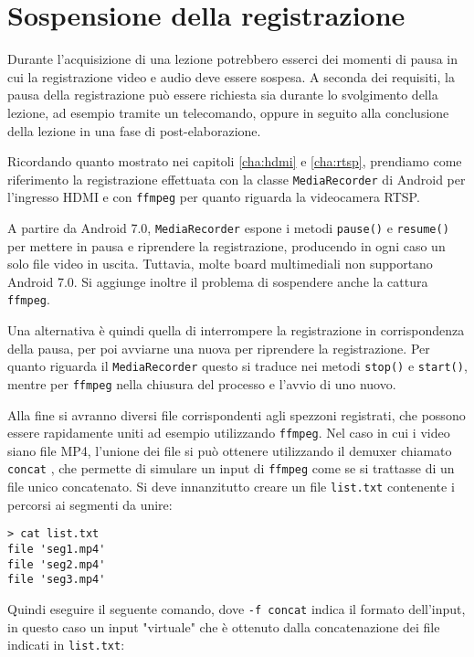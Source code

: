 \chapter{Sospensione della registrazione}
\label{cha:pausa}

Durante l'acquisizione di una lezione potrebbero esserci dei momenti di pausa in cui la registrazione video e audio deve essere sospesa. A seconda dei requisiti, la pausa della registrazione può essere richiesta sia durante lo svolgimento della lezione, ad esempio tramite un telecomando, oppure in seguito alla conclusione della lezione in una fase di post-elaborazione.

Ricordando quanto mostrato nei capitoli \ref{cha:hdmi} e \ref{cha:rtsp}, prendiamo come riferimento la registrazione effettuata con la classe \texttt{MediaRecorder} di Android per l'ingresso HDMI e con \texttt{ffmpeg} per quanto riguarda la videocamera RTSP.

A partire da Android 7.0, \texttt{MediaRecorder} espone i metodi \texttt{pause()} e \texttt{resume()} per mettere in pausa e riprendere la registrazione, producendo in ogni caso un solo file video in uscita. Tuttavia, molte board multimediali non supportano Android 7.0. Si aggiunge inoltre il problema di sospendere anche la cattura \texttt{ffmpeg}.

Una alternativa è quindi quella di interrompere la registrazione in corrispondenza della pausa, per poi avviarne una nuova per riprendere la registrazione. Per quanto riguarda il \texttt{MediaRecorder} questo si traduce nei metodi \texttt{stop()} e \texttt{start()}, mentre per \texttt{ffmpeg} nella chiusura del processo e l'avvio di uno nuovo.

Alla fine si avranno diversi file corrispondenti agli spezzoni registrati, che possono essere rapidamente uniti ad esempio utilizzando \texttt{ffmpeg}. Nel caso in cui i video siano file MP4, l'unione dei file si può ottenere utilizzando il demuxer chiamato \texttt{concat} \cite{ffmpeg}, che permette di simulare un input di \texttt{ffmpeg} come se si trattasse di un file unico concatenato. Si deve innanzitutto creare un file \texttt{list.txt} contenente i percorsi ai segmenti da unire:

\begin{verbatim}
> cat list.txt
file 'seg1.mp4'
file 'seg2.mp4'
file 'seg3.mp4'
\end{verbatim}

Quindi eseguire il seguente comando, dove \texttt{-f concat} indica il formato dell'input, in questo caso un input "virtuale" che è ottenuto dalla concatenazione dei file indicati in \texttt{list.txt}:

